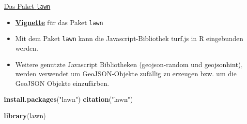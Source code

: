 \documentclass[ignorenonframetext,]{beamer}
\newenvironment{Shaded}{\begin{snugshade}}{\end{snugshade}}
\newcommand{\KeywordTok}[1]{\textcolor[rgb]{0.13,0.29,0.53}{\textbf{#1}}}
\newcommand{\NormalTok}[1]{#1}
\newcommand{\StringTok}[1]{\textcolor[rgb]{0.31,0.60,0.02}{#1}}
\begin{document}
\begin{frame}[fragile]{\href{https://cran.r-project.org/web/packages/lawn/index.html}{Das
Paket \texttt{lawn}}}
\protect\hypertarget{das-paket-lawn}{}

\begin{itemize}
\item
  \href{https://cran.r-project.org/web/packages/lawn/vignettes/lawn_vignette.html}{\textbf{Vignette}}
  für das Paket \texttt{lawn}
\item
  Mit dem Paket \texttt{lawn} kann die Javascript-Bibliothek turf.js in
  R eingebunden werden.
\item
  Weitere genutzte Javascript Bibliotheken (geojson-random und
  geojsonhint), werden verwendet um GeoJSON-Objekte zufällig zu erzeugen
  bzw. um die GeoJSON Objekte einzufärben.
\end{itemize}

\begin{Shaded}
\begin{Highlighting}[]
\KeywordTok{install.packages}\NormalTok{(}\StringTok{"lawn"}\NormalTok{)}
\KeywordTok{citation}\NormalTok{(}\StringTok{"lawn"}\NormalTok{)}
\end{Highlighting}
\end{Shaded}

\begin{Shaded}
\begin{Highlighting}[]
\KeywordTok{library}\NormalTok{(lawn)}
\end{Highlighting}
\end{Shaded}

\end{frame}
\end{document}
